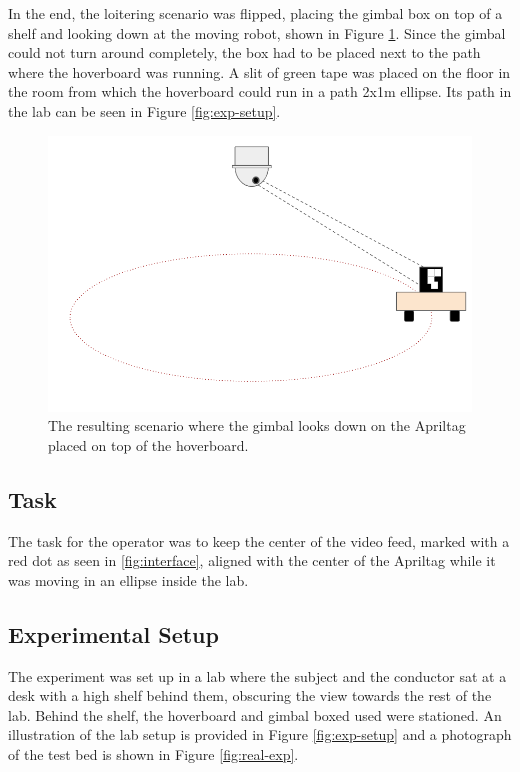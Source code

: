 \documentclass[nofilelist]{cslthse-msc}
\begin{document}
In the end, the loitering scenario was flipped, placing the gimbal box on top of a shelf and looking down at the moving robot, shown in Figure \ref{fig:testbed-idea-2}. Since the gimbal could not turn around completely, the box had to be placed next to the path where the hoverboard was running. A slit of green tape was placed on the floor in the room from which the hoverboard could run in a path 2x1m ellipse. Its path in the lab can be seen in Figure \ref{fig:exp-setup}.

\begin{figure}[htp]
   \centering
   \includegraphics[width=.6\textwidth]{images/testbed2.png}
   \caption{The resulting scenario where the gimbal looks down on the Apriltag placed on top of the hoverboard.}
   \label{fig:testbed-idea-2}
\end{figure}

\subsection{Task}
The task for the operator was to keep the center of the video feed, marked with a red dot as seen in \ref{fig:interface}, aligned with the center of the Apriltag while it was moving in an ellipse inside the lab.

\subsection{Experimental Setup}
The experiment was set up in a lab where the subject and the conductor sat at a desk with a high shelf behind them, obscuring the view towards the rest of the lab. Behind the shelf, the hoverboard and gimbal boxed used were stationed. An illustration of the lab setup is provided in Figure \ref{fig:exp-setup} and a photograph of the test bed is shown in Figure \ref{fig:real-exp}.
\end{document}
